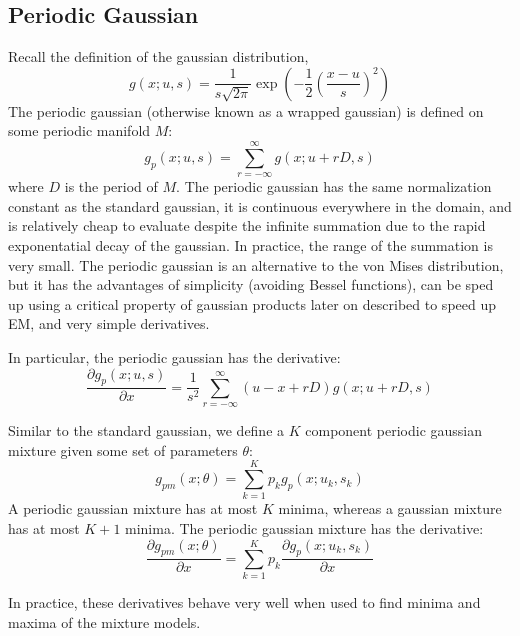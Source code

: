 \documentclass{acm_proc_article-sp}
\begin{document}
\subsection{Periodic Gaussian}
Recall the definition of the gaussian distribution,
\begin{equation}
g(x; u,s) = \dfrac{1}{s\sqrt{2\pi}} \exp\left(-\dfrac{1}{2} \left(\dfrac{x-u}{s}\right)^2\right)
\end{equation}
The periodic gaussian (otherwise known as a wrapped gaussian) is defined on some periodic manifold \textbf{$M$}:
\begin{equation}
g_p(x; u,s) = \sum_{r=-\infty}^{\infty} g(x; u+rD, s)
\end{equation}
where \textbf{$D$} is the period of \textbf{$M$}. The periodic gaussian has the same normalization constant as the standard gaussian, it is continuous everywhere in the domain, and is relatively cheap to evaluate despite the infinite summation due to the rapid exponentatial decay of the gaussian. In practice, the range of the summation is very small. The periodic gaussian is an alternative to the von Mises distribution, but it has the advantages of simplicity (avoiding Bessel functions), can be sped up using a critical property of gaussian products later on described to speed up EM,  and very simple derivatives.

In particular, the periodic gaussian has the derivative:
\begin{equation}
\dfrac{\partial g_p(x;u,s)}{\partial x} = \dfrac{1}{s^2} \sum_{r=-\infty}^{\infty} (u-x+rD) g(x; u+rD, s)
\end{equation}

Similar to the standard gaussian, we define a \textbf{$K$} component periodic gaussian mixture given some set of parameters \textbf{$\theta$}:
\begin{equation}
g_{pm}(x;\theta) = \sum_{k=1}^{K} p_k g_p(x; u_k, s_k)
\end{equation}
A periodic gaussian mixture has at most \textbf{$K$} minima, whereas a gaussian mixture has at most \textbf{$K+1$} minima. The periodic gaussian mixture has the derivative:
\begin{equation}
\dfrac{\partial g_{pm}(x; \theta)}{\partial x} =  \sum_{k=1}^{K} p_k \dfrac{\partial g_p(x; u_k, s_k)}{\partial x}
\end{equation}

In practice, these derivatives behave very well when used to find minima and maxima of the mixture models.
\end{document}

